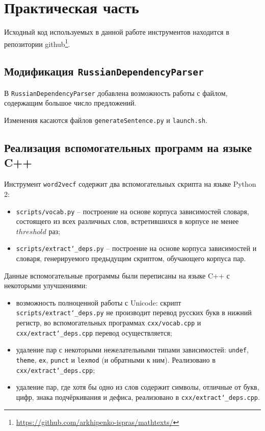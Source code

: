 \section{Практическая часть}
\label{sec:Chapter4} 

Исходный код используемых в данной работе инструментов находится в репозитории github\footnote{\url{https://github.com/arkhipenko-ispras/mathtexts/}}.

\subsection{Модификация \texttt{RussianDependencyParser}}

В \texttt{RussianDependencyParser} добавлена возможность работы с файлом, содержащим большое число предложений.

Изменения касаются файлов \texttt{generateSentence.py} и \texttt{launch.sh}.

\subsection{Реализация вспомогательных программ на языке C++}

Инструмент \texttt{word2vecf} содержит два вспомогательных скрипта на языке Python 2:
\begin{itemize}
	\item
	\texttt{scripts/vocab.py} -- построение на основе корпуса зависимостей словаря, состоящего из всех различных слов, встретившихся в корпусе не менее \(threshold\) раз;
	\item
	\texttt{scripts/extract\char`_deps.py} -- построение на основе корпуса зависимостей и словаря, генерируемого предыдущим скриптом, обучающего корпуса пар.
\end{itemize}

Данные вспомогательные программы были переписаны на языке C++ с некоторыми улучшениями:
\begin{itemize}
	\item
	возможность полноценной работы с Unicode: скрипт \texttt{scripts/extract\char`_deps.py} не производит перевод русских букв в нижний регистр, во вспомогательных программах \texttt{cxx/vocab.cpp} и \texttt{cxx/extract\char`_deps.cpp} перевод осуществляется;
	\item
	удаление пар с некоторыми нежелательными типами зависимостей: \texttt{undef}, \texttt{theme}, \texttt{ex}, \texttt{punct} и \texttt{lexmod} (и обратными к ним). Реализовано в \texttt{cxx/extract\char`_deps.cpp};
	\item
	удаление пар, где хотя бы одно из слов содержит символы, отличные от букв, цифр, знака подчёркивания и дефиса, реализовано в \texttt{cxx/extract\char`_deps.cpp}.
\end{itemize}

